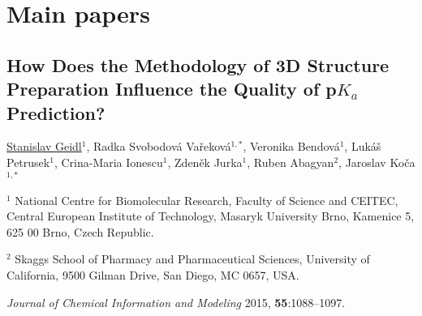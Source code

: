 \chapter{Main papers}
\label{chapter:papers}

\clearpage

\begin{center}
\section{\centering How Does the Methodology of 3D Structure
Preparation Influence the Quality of p$K_a$ Prediction?}
    
\underline{Stanislav Geidl$^1$}, Radka Svobodová Vařeková$^{1, *}$,
Veronika Bendová$^1$, Lukáš Petrusek$^1$, Crina-Maria Ionescu$^1$,
Zdeněk Jurka$^1$, Ruben Abagyan$^2$, Jaroslav Koča$^{1, *}$

\vspace{1cm}

$^1$ National Centre for Biomolecular Research, Faculty of Science and CEITEC,
Central European Institute of Technology, Masaryk University Brno, Kamenice 5,
625 00 Brno, Czech Republic.

$^2$ Skaggs School of Pharmacy and Pharmaceutical Sciences, University of
California, 9500 Gilman Drive, San Diego, MC 0657, USA.

\vspace{1cm}

\textit{Journal of Chemical Information and  Modeling} 2015, \textbf{55}:1088–1097.

\end{center}

% 


